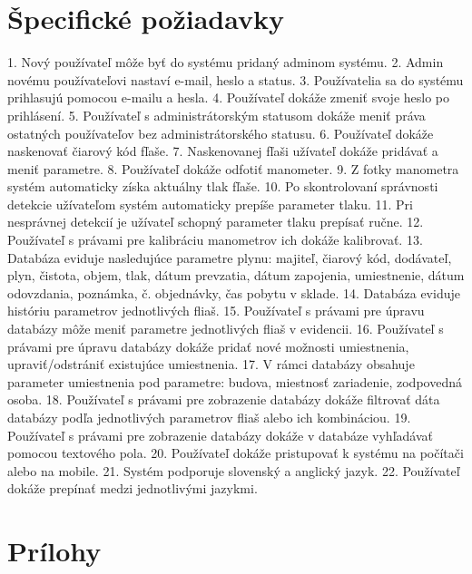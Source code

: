 \documentclass[hreffootnote]{zah}
\begin{document}
\cleardoublepage
\section{Špecifické požiadavky}
1.	Nový používateľ môže byť do systému pridaný adminom systému.
2.	Admin novému používateľovi nastaví e-mail, heslo a status.
3.	Používatelia sa do systému prihlasujú pomocou e-mailu a hesla.
4.	Používateľ dokáže zmeniť svoje heslo po prihlásení.
5.	Používateľ s administrátorským statusom dokáže meniť práva ostatných používateľov bez administrátorského statusu.
6.	Používateľ dokáže naskenovať čiarový kód fľaše.
7.	Naskenovanej fľaši užívateľ dokáže pridávať a meniť parametre.
8.	Používateľ dokáže odfotiť manometer.
9.	Z fotky manometra systém automaticky získa aktuálny tlak fľaše.
10.	Po skontrolovaní správnosti detekcie užívateľom systém automaticky prepíše parameter tlaku.
11.	Pri nesprávnej detekcií je užívateľ schopný parameter tlaku prepísať ručne.
12.	Používateľ s právami pre kalibráciu manometrov ich dokáže kalibrovať.
13.	Databáza eviduje nasledujúce parametre plynu: majiteľ, čiarový kód, dodávateľ, plyn, čistota, objem, tlak, dátum prevzatia, dátum zapojenia, umiestnenie, dátum odovzdania, poznámka, č. objednávky, čas 	pobytu v sklade.
14.	Databáza eviduje históriu parametrov jednotlivých fliaš. 
15.	Používateľ s právami pre úpravu databázy môže meniť parametre jednotlivých fliaš v evidencii. 
16.	Používateľ s právami pre úpravu databázy dokáže pridať nové možnosti umiestnenia, upraviť/odstrániť existujúce umiestnenia.
17.	V rámci databázy obsahuje parameter umiestnenia pod parametre: budova, miestnosť zariadenie, zodpovedná osoba.
18.	Používateľ s právami pre zobrazenie databázy dokáže filtrovať dáta databázy podľa jednotlivých parametrov fliaš alebo ich kombináciou.
19.	Používateľ s právami pre zobrazenie databázy dokáže v databáze vyhľadávať pomocou textového pola.
20.	Používateľ dokáže pristupovať k systému na počítači alebo na mobile.
21.	Systém podporuje slovenský a anglický jazyk. 
22.	Používateľ dokáže prepínať medzi jednotlivými jazykmi.

\label{reqs}

\cleardoublepage
\section{Prílohy}
\end{document}
